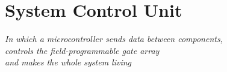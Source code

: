 \chapter{System Control Unit}\label{ch:avr}

\begin{flushright}{\slshape
    In which a microcontroller sends data between components,\\
    controls the field-programmable gate array\\
    and makes the whole system living
}
\end{flushright}






